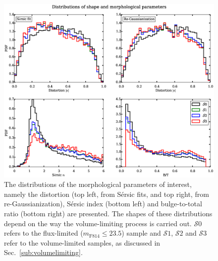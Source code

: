 \documentclass[twocolumn,useAMS,usenatbib]{mn2e}
\newcommand{\rachel}[1]{{\textcolor{red}{#1}}}
\newcommand{\arun}[1]{{\textcolor{blue}{#1}}}
\newcommand{\sersic}{S\'{e}rsic }
\newcommand{\s}{\ensuremath{\mathcal{S}}}
\begin{document}
% 
\begin{figure}
 \centering
 \includegraphics[width=2.2\columnwidth]{sample_histograms}
 \caption{The distributions of the morphological parameters of interest, namely the distortion (top left, from \sersic fits, and top right, from re-Gaussianization), \sersic index (bottom left) and bulge-to-total ratio (bottom right) are presented. 
          The shapes of these distributions depend on the way the volume-limiting process is carried out. \s$0$ refers to the flux-limited ($m_\text{F814}\le23.5$) sample
          and \s$1$, \s$2$ and \s$3$ refer to the volume-limited
          samples, as discussed in
          Sec.~\ref{sub:volumelimiting}. 
  }
  \label{fig:sample_histograms}
\end{figure}
\end{document}
